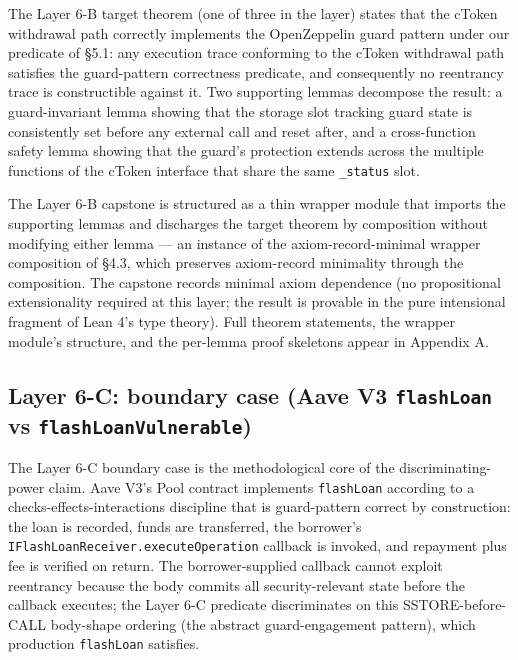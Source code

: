 The Layer 6-B target theorem (one of three in the layer) states that the
cToken withdrawal path correctly implements the OpenZeppelin guard
pattern under our predicate of §5.1: any execution trace conforming to
the cToken withdrawal path satisfies the guard-pattern correctness
predicate, and consequently no reentrancy trace is constructible against
it. Two supporting lemmas decompose the result: a guard-invariant lemma
showing that the storage slot tracking guard state is consistently set
before any external call and reset after, and a cross-function safety
lemma showing that the guard's protection extends across the multiple
functions of the cToken interface that share the same \texttt{\_status}
slot.

The Layer 6-B capstone is structured as a thin wrapper module that
imports the supporting lemmas and discharges the target theorem by
composition without modifying either lemma --- an instance of the
axiom-record-minimal wrapper composition of §4.3, which preserves
axiom-record minimality through the composition. The capstone records
minimal axiom dependence (no propositional extensionality required at
this layer; the result is provable in the pure intensional fragment of
Lean 4's type theory). Full theorem statements, the wrapper module's
structure, and the per-lemma proof skeletons appear in Appendix A.

\subsection{\texorpdfstring{Layer 6-C: boundary case (Aave V3
\texttt{flashLoan} vs
\texttt{flashLoanVulnerable})}{Layer 6-C: boundary case (Aave V3 flashLoan vs flashLoanVulnerable)}}\label{layer-6-c-boundary-case-aave-v3-flashloan-vs-flashloanvulnerable}

The Layer 6-C boundary case is the methodological core of the
discriminating-power claim. Aave V3's Pool contract implements
\texttt{flashLoan} according to a checks-effects-interactions discipline
that is guard-pattern correct by construction: the loan is recorded,
funds are transferred, the borrower's
\texttt{IFlashLoanReceiver.executeOperation} callback is invoked, and
repayment plus fee is verified on return. The borrower-supplied callback
cannot exploit reentrancy because the body commits all security-relevant
state before the callback executes; the Layer 6-C predicate
discriminates on this SSTORE-before-CALL body-shape ordering (the
abstract guard-engagement pattern), which production \texttt{flashLoan}
satisfies.

